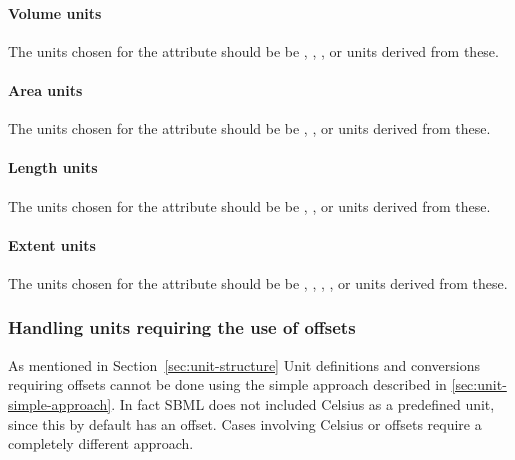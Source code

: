 \paragraph{Volume units}
\label{sec:bp:unitdefinitions:recommendedunits:volumeUnits}
The units chosen for the attribute  should be
be , , , or
units derived from these.  

\paragraph{Area units}
\label{sec:bp:unitdefinitions:recommendedunits:areaUnits}
The units chosen for the attribute  should be be
, , or units derived from
these. 

\paragraph{Length units}
\label{sec:bp:unitdefinitions:recommendedunits:lengthUnits}
The units chosen for the attribute  should be
be , , or units derived from these.  

\paragraph{Extent units}
\label{sec:bp:unitdefinitions:recommendedunits:extentUnits}
The units chosen for the attribute  should be
be , , ,
, or units derived from these.  

\subsubsection{Handling units requiring the use of offsets}
\label{sec:bp:unitdefinitions:offset}

As mentioned in Section~\ref{sec:unit-structure} Unit definitions
and conversions requiring offsets cannot be done using the simple
approach described in \ref{sec:unit-simple-approach}.  In fact
SBML does not included Celsius as a predefined unit, since this by
default has an offset. Cases involving Celsius or offsets require
a completely different approach.

